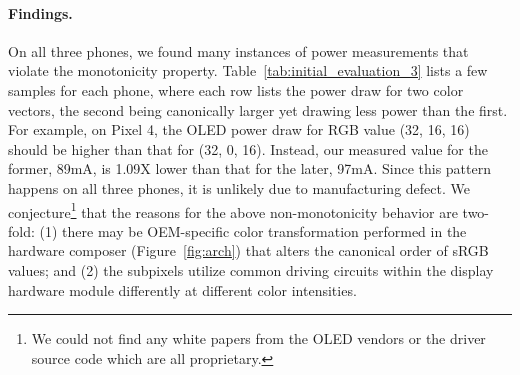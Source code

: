 \paragraph{Findings.}
On all three phones, we found many instances of power measurements
that violate the monotonicity property.
Table~\ref{tab:initial_evaluation_3} lists a few samples for each 
phone, where each row lists the power draw for two color vectors, the
second being canonically larger yet drawing less power than the first.
For example, on Pixel 4, the OLED power draw for RGB value (32, 16, 16) should
be higher than that for (32, 0, 16). Instead,
our measured value for the former, 89mA, 
is 1.09X
lower than that for the later, 97mA.
Since this pattern happens on all three phones,
it is unlikely due to manufacturing defect.
We conjecture\footnote{We could not find any white papers from the OLED vendors
  or the driver source code which are all proprietary.}
that the reasons for the above non-monotonicity behavior
{are two-fold:
(1) there may be OEM-specific color transformation performed
in the hardware composer (Figure~\ref{fig:arch}) that alters the canonical
order of sRGB values;
and
(2) the subpixels utilize
common driving circuits within the display hardware module
differently at different color intensities.
}


